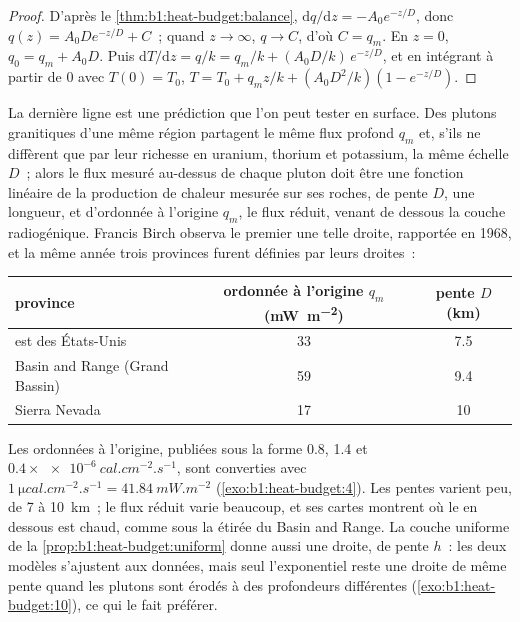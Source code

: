 \begin{proof}
D'après le \cref{thm:b1:heat-budget:balance}, $\mathrm dq/\mathrm dz =
-A_0e^{-z/D}$, donc $q(z) = A_0 D e^{-z/D} + C$~; quand $z \to \infty$, $q \to C$,
d'où $C = q_m$. En $z = 0$, $q_0 = q_m + A_0 D$. Puis $\mathrm dT/\mathrm dz =
q/k = q_m/k + (A_0D/k)\,e^{-z/D}$, et en intégrant à partir de $0$ avec $T(0) = T_0$,
$T = T_0 + q_m z/k + (A_0 D^2/k)(1 - e^{-z/D})$.
\end{proof}

La dernière ligne est une prédiction que l'on peut tester en surface. Des plutons
granitiques d'une même région partagent le même flux profond $q_m$ et, s'ils ne
diffèrent que par leur richesse en uranium, thorium et potassium, la même échelle
$D$~; alors le flux mesuré au-dessus de chaque pluton doit être une fonction
linéaire de la production de chaleur mesurée sur ses roches, de pente $D$, une
longueur, et d'ordonnée à l'origine $q_m$, le flux réduit, venant de
dessous la couche radiogénique. Francis Birch observa le premier une telle droite,
rapportée en 1968, et la même année trois provinces furent définies par leurs
droites~:
\begin{center}
\small
\begin{tabular}{lcc}
\hline
province & ordonnée à l'origine $q_m$ (\unit{mW.m^{-2}}) & pente $D$ (\unit{km}) \\
\hline
est des États-Unis & 33 & 7.5 \\
Basin and Range (Grand Bassin) & 59 & 9.4 \\
Sierra Nevada & 17 & 10 \\
\hline
\end{tabular}
\end{center}
Les ordonnées à l'origine, publiées sous la forme 0.8, 1.4 et $0.4\times\qty{e-6}{cal.cm^{-2}.s^{-1}}$,
sont converties avec $\qty{1}{\micro cal.cm^{-2}.s^{-1}} = \qty{41.84}{mW.m^{-2}}$
(\cref{exo:b1:heat-budget:4}). Les pentes varient peu, de 7 à \qty{10}{km}~; le flux
réduit varie beaucoup, et ses cartes montrent où le  en dessous est chaud,
comme sous la  étirée du Basin and Range. La couche uniforme de
la \cref{prop:b1:heat-budget:uniform} donne aussi une droite, de pente $h$~:
les deux modèles s'ajustent aux données, mais seul l'exponentiel reste une droite
de même pente quand les plutons sont érodés à des profondeurs différentes
(\cref{exo:b1:heat-budget:10}), ce qui le fait préférer.

